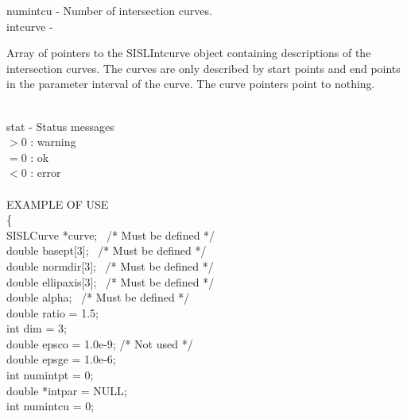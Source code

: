         \>\>    {\fov numintcu}\> - \>Number of intersection curves.\\
        \>\>    {\fov intcurve}\> - \>  \begin{minipg2}
                        Array of pointers to the SISLIntcurve object
                        containing descriptions of the intersection
                        curves. The curves are only described by start
                        points and end points in
                        the parameter interval of the curve. The curve
                        pointers point to nothing.
                                \end{minipg2}\\[0.8ex]
        \>\>    {\fov stat}     \> - \> Status messages\\
                \>\>\>\>\>              $> 0$   : warning\\
                \>\>\>\>\>              $= 0$   : ok\\
                \>\>\>\>\>              $< 0$   : error\\
\\
EXAMPLE OF USE\\
                \>      \{ \\
                \>\>    SISLCurve       \>      *{\fov curve}; \, /* Must be defined */\\
                \>\>    double  \>      {\fov basept}[3]; \, /* Must be defined */\\
                \>\>    double  \>      {\fov normdir}[3]; \, /* Must be defined */\\
                \>\>    double  \>      {\fov ellipaxis}[3]; \, /* Must be defined */\\
                \>\>    double  \>      {\fov alpha}; \, /* Must be defined */\\
                \>\>    double  \>      {\fov ratio} = 1.5;\\
                \>\>    int     \>      {\fov dim} = 3;\\
                \>\>    double  \>      {\fov epsco} = 1.0e-9; /* Not used */\\
                \>\>    double  \>      {\fov epsge} = 1.0e-6;\\
                \>\>    int     \>      {\fov numintpt} = 0;\\
                \>\>    double  \>      *{\fov intpar} = NULL;\\
                \>\>    int     \>      {\fov numintcu} = 0;\\

